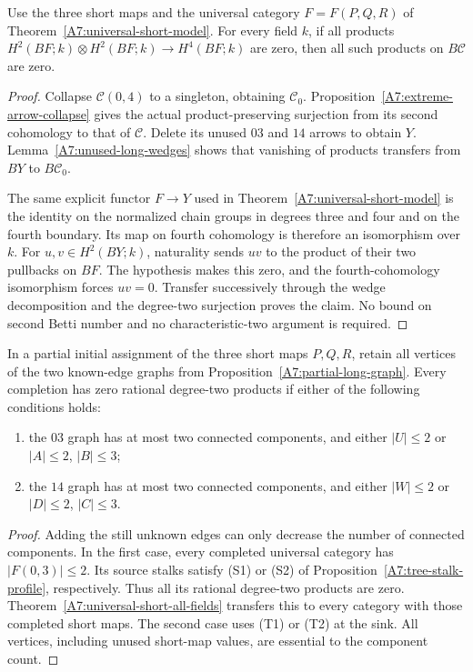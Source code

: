 \begin{theorem}
\label{A7:universal-short-all-fields}
Use the three short maps and the universal category
$F=F(P,Q,R)$ of Theorem~\ref{A7:universal-short-model}.
For every field $k$, if all products
$H^2(BF;k)\otimes H^2(BF;k)\to H^4(BF;k)$ are zero,
then all such products on $B\mathcal C$ are zero.
\end{theorem}
\begin{proof}
Collapse $\mathcal C(0,4)$ to a singleton, obtaining
$\mathcal C_0$. Proposition~\ref{A7:extreme-arrow-collapse}
gives the actual product-preserving surjection from
its second cohomology to that of $\mathcal C$.
Delete its unused $03$ and $14$ arrows to obtain $Y$.
Lemma~\ref{A7:unused-long-wedges} shows that vanishing
of products transfers from $BY$ to $B\mathcal C_0$.

The same explicit functor $F\to Y$ used in
Theorem~\ref{A7:universal-short-model} is the identity
on the normalized chain groups in degrees three and
four and on the fourth boundary. Its map on fourth
cohomology is therefore an isomorphism over $k$.
For $u,v\in H^2(BY;k)$, naturality sends $uv$ to
the product of their two pullbacks on $BF$. The
hypothesis makes this zero, and the fourth-cohomology
isomorphism forces $uv=0$. Transfer successively
through the wedge decomposition and the degree-two
surjection proves the claim. No bound on second
Betti number and no characteristic-two argument
is required.
\end{proof}

\begin{corollary}
\label{A7:partial-long-tree}
In a partial initial assignment of the three short
maps $P,Q,R$, retain all vertices of the two known-edge
graphs from Proposition~\ref{A7:partial-long-graph}.
Every completion has zero rational degree-two products
if either of the following conditions holds:
\begin{enumerate}
\item the $03$ graph has at most two connected components,
and either $|U|\leq2$ or $|A|\leq2$, $|B|\leq3$;
\item the $14$ graph has at most two connected components,
and either $|W|\leq2$ or $|D|\leq2$, $|C|\leq3$.
\end{enumerate}
\end{corollary}
\begin{proof}
Adding the still unknown edges can only decrease the
number of connected components. In the first case,
every completed universal category has $|F(0,3)|\leq2$.
Its source stalks satisfy (S1) or (S2) of
Proposition~\ref{A7:tree-stalk-profile}, respectively.
Thus all its rational degree-two products are zero.
Theorem~\ref{A7:universal-short-all-fields} transfers
this to every category with those completed short
maps. The second case uses (T1) or (T2) at the sink.
All vertices, including unused short-map values,
are essential to the component count.
\end{proof}
